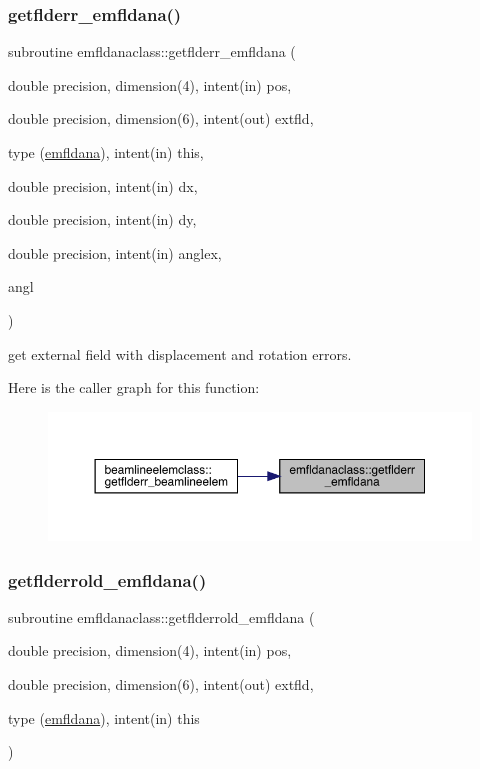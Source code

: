 \subsubsection{\texorpdfstring{getflderr\_emfldana()}{getflderr\_emfldana()}}
{\footnotesize\ttfamily subroutine emfldanaclass\+::getflderr\+\_\+emfldana (\begin{DoxyParamCaption}\item[{double precision, dimension(4), intent(in)}]{pos,  }\item[{double precision, dimension(6), intent(out)}]{extfld,  }\item[{type (\mbox{\hyperlink{namespaceemfldanaclass_structemfldanaclass_1_1emfldana}{emfldana}}), intent(in)}]{this,  }\item[{double precision, intent(in)}]{dx,  }\item[{double precision, intent(in)}]{dy,  }\item[{double precision, intent(in)}]{anglex,  }\item[{}]{angl }\end{DoxyParamCaption})}



get external field with displacement and rotation errors. 

Here is the caller graph for this function\+:\nopagebreak
\begin{figure}[H]
\begin{center}
\leavevmode
\includegraphics[width=350pt]{namespaceemfldanaclass_a95772a7b3030b57d7c0753ef96a2f764_icgraph}
\end{center}
\end{figure}
\mbox{\label{namespaceemfldanaclass_a653a95a05e7093fca664a1a8ba38e991}} 
\subsubsection{\texorpdfstring{getflderrold\_emfldana()}{getflderrold\_emfldana()}}
{\footnotesize\ttfamily subroutine emfldanaclass\+::getflderrold\+\_\+emfldana (\begin{DoxyParamCaption}\item[{double precision, dimension(4), intent(in)}]{pos,  }\item[{double precision, dimension(6), intent(out)}]{extfld,  }\item[{type (\mbox{\hyperlink{namespaceemfldanaclass_structemfldanaclass_1_1emfldana}{emfldana}}), intent(in)}]{this }\end{DoxyParamCaption})}



